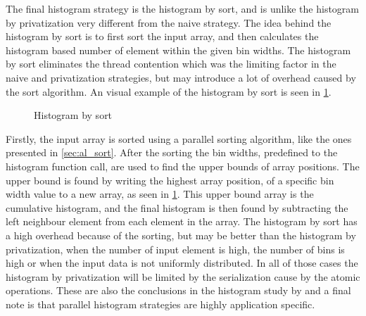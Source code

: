 The final histogram strategy is the histogram by sort, and is unlike the histogram by privatization very different from the naive strategy. The idea behind the histogram by sort is to first sort the input array, and then calculates the histogram based number of element within the given bin widths. The histogram by sort eliminates the thread contention which was the limiting factor in the naive and privatization strategies, but may introduce a lot of overhead caused by the sort algorithm. An visual example of the histogram by sort is seen in \cref{fig:hist_sort}. 

\begin{figure}[ht]
	\centering
	\caption{Histogram by sort}
	\label{fig:hist_sort}
\end{figure} 

Firstly, the input array is sorted using a parallel sorting algorithm, like the ones presented in \cref{sec:al_sort}. After the sorting the bin widths, predefined to the histogram function call, are used to find the upper bounds of array positions. The upper bound is found by writing the highest array position, of a specific bin width value to a new array, as seen in \cref{fig:hist_sort}. This upper bound array is the cumulative histogram, and the final histogram is then found by subtracting the left neighbour element from each element in the array. 
The histogram by sort has a high overhead because of the sorting, but may be better than the histogram by privatization, when the number of input element is high, the number of bins is high or when the input data is not uniformly distributed. In all of those cases the histogram by privatization will be limited by the serialization cause by the atomic operations. These are also the conclusions in the histogram study by \cite{MilicHistogram} and a final note is that parallel histogram strategies are highly application specific.